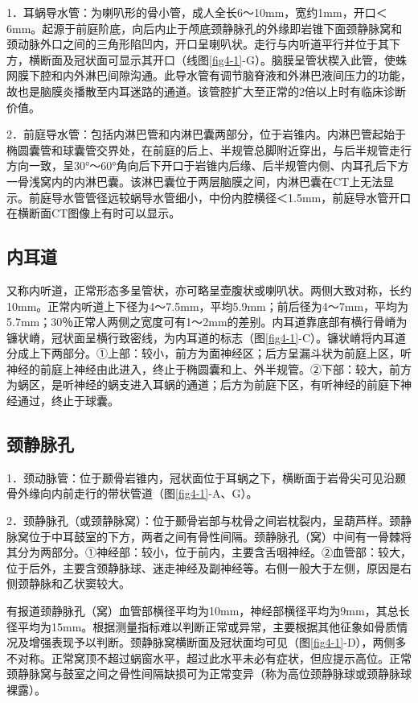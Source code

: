1．耳蜗导水管：为喇叭形的骨小管，成人全长6～10mm，宽约1mm，开口＜6mm。起源于前庭阶底，向后内止于颅底颈静脉孔的外缘即岩锥下面颈静脉窝和颈动脉外口之间的三角形陷凹内，开口呈喇叭状。走行与内听道平行并位于其下方，横断面及冠状面可显示其开口（线图\ref{fig4-1}-G）。脑膜呈管状楔入此管，使蛛网膜下腔和内外淋巴间隙沟通。此导水管有调节脑脊液和外淋巴液间压力的功能，故也是脑膜炎播散至内耳迷路的通道。该管腔扩大至正常的2倍以上时有临床诊断价值。

2．前庭导水管：包括内淋巴管和内淋巴囊两部分，位于岩锥内。内淋巴管起始于椭圆囊管和球囊管交界处，在前庭的后上、半规管总脚附近穿出，与后半规管走行方向一致，呈30°～60°角向后下开口于岩锥内后缘、后半规管内侧、内耳孔后下方一骨浅窝内的内淋巴囊。该淋巴囊位于两层脑膜之间，内淋巴囊在CT上无法显示。前庭导水管管径远较蜗导水管细小，中份内腔横径＜1.5mm，前庭导水管开口在横断面CT图像上有时可以显示。

\subsection{内耳道}

又称内听道，正常形态多呈管状，亦可略呈壶腹状或喇叭状。两侧大致对称，长约10mm。正常内听道上下径为4～7.5mm，平均5.9mm；前后径为4～7mm，平均为5.7mm；30％正常人两侧之宽度可有1～2mm的差别。内耳道靠底部有横行骨嵴为镰状嵴，冠状面呈横行致密线，为内耳道的标志（图\ref{fig4-1}-C）。镰状嵴将内耳道分成上下两部分。①上部：较小，前方为面神经区；后方呈漏斗状为前庭上区，听神经的前庭上神经由此进入，终止于椭圆囊和上、外半规管。②下部：较大，前方为蜗区，是听神经的蜗支进入耳蜗的通道；后方为前庭下区，有听神经的前庭下神经通过，终止于球囊。

\subsection{颈静脉孔}

1．颈动脉管：位于颞骨岩锥内，冠状面位于耳蜗之下，横断面于岩骨尖可见沿颞骨外缘向内前走行的带状管道（图\ref{fig4-1}-A、G）。

2．颈静脉孔（或颈静脉窝）：位于颞骨岩部与枕骨之间岩枕裂内，呈葫芦样。颈静脉窝位于中耳鼓室的下方，两者之间有骨性间隔。颈静脉孔（窝）中间有一骨棘将其分为两部分。①神经部：较小，位于前内，主要含舌咽神经。②血管部：较大，位于后外，主要含颈静脉球、迷走神经及副神经等。右侧一般大于左侧，原因是右侧颈静脉和乙状窦较大。

有报道颈静脉孔（窝）血管部横径平均为10mm，神经部横径平均为9mm，其总长径平均为15mm。根据测量指标难以判断正常或异常，主要根据其他征象如骨质情况及增强表现予以判断。颈静脉窝横断面及冠状面均可见（图\ref{fig4-1}-D），两侧多不对称。正常窝顶不超过蜗窗水平，超过此水平未必有症状，但应提示高位。正常颈静脉窝与鼓室之间之骨性间隔缺损可为正常变异（称为高位颈静脉球或颈静脉球裸露）。

